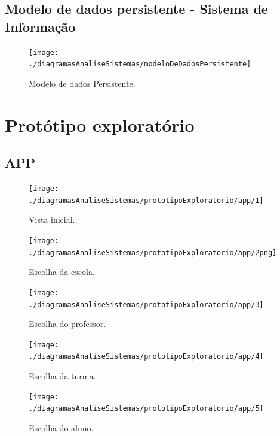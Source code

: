 \documentclass[a4paper]{article}
\begin{document}
		\subsection{Modelo de dados persistente - Sistema de Informação}
		
		
		
		\begin{figure}[h]
			\centering
			\texttt{[image: ./diagramasAnaliseSistemas/modeloDeDadosPersistente]}
			\caption{Modelo de dados Persistente.}
			\label{fig:modeloDeDadosPersistente}
		\end{figure}

		\newpage

		\section{Protótipo exploratório}
		
		\subsection{APP}
		
		\begin{figure}[h]
\centering
\texttt{[image: ./diagramasAnaliseSistemas/prototipoExploratorio/app/1]}
\caption{Vista inicial.}
\label{fig:1}
\end{figure}

\begin{figure}[h]
\centering
\texttt{[image: ./diagramasAnaliseSistemas/prototipoExploratorio/app/2png]}
\caption{Escolha da escola.}
\label{fig:2png}
\end{figure}

\newpage

\begin{figure}[h]
\centering
\texttt{[image: ./diagramasAnaliseSistemas/prototipoExploratorio/app/3]}
\caption{Escolha do professor.}
\label{fig:3}
\end{figure}

\begin{figure}[h]
\centering
\texttt{[image: ./diagramasAnaliseSistemas/prototipoExploratorio/app/4]}
\caption{Escolha da turma.}
\label{fig:4}
\end{figure}

\newpage

\begin{figure}[h]
\centering
\texttt{[image: ./diagramasAnaliseSistemas/prototipoExploratorio/app/5]}
\caption{Escolha do aluno.}
\label{fig:5}
\end{figure}
\end{document}
